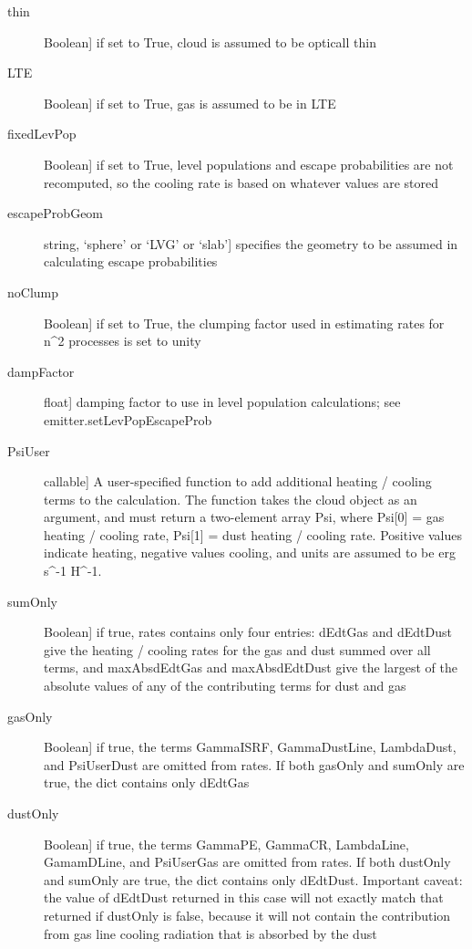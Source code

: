 \documentclass[letterpaper,10pt,english]{sphinxmanual}
\begin{document}
\begin{fulllineitems}
\begin{fulllineitems}
\begin{description}
\begin{description}
\item[{thin}] \leavevmode{[}Boolean{]}
if set to True, cloud is assumed to be opticall thin

\item[{LTE}] \leavevmode{[}Boolean{]}
if set to True, gas is assumed to be in LTE

\item[{fixedLevPop}] \leavevmode{[}Boolean{]}
if set to True, level populations and escape
probabilities are not recomputed, so the cooling rate is
based on whatever values are stored

\item[{escapeProbGeom}] \leavevmode{[}string, `sphere' or `LVG' or `slab'{]}
specifies the geometry to be assumed in calculating
escape probabilities

\item[{noClump}] \leavevmode{[}Boolean{]}
if set to True, the clumping factor used in estimating
rates for n\textasciicircum{}2 processes is set to unity

\item[{dampFactor}] \leavevmode{[}float{]}
damping factor to use in level population calculations;
see emitter.setLevPopEscapeProb

\item[{PsiUser}] \leavevmode{[}callable{]}
A user-specified function to add additional heating /
cooling terms to the calculation. The function takes the
cloud object as an argument, and must return a two-element
array Psi, where Psi{[}0{]} = gas heating / cooling rate,
Psi{[}1{]} = dust heating / cooling rate. Positive values
indicate heating, negative values cooling, and units are
assumed to be erg s\textasciicircum{}-1 H\textasciicircum{}-1.

\item[{sumOnly}] \leavevmode{[}Boolean{]}
if true, rates contains only four entries: dEdtGas and
dEdtDust give the heating / cooling rates for the
gas and dust summed over all terms, and maxAbsdEdtGas and
maxAbsdEdtDust give the largest of the absolute values of
any of the contributing terms for dust and gas

\item[{gasOnly}] \leavevmode{[}Boolean{]}
if true, the terms GammaISRF, GammaDustLine, LambdaDust,               and PsiUserDust are omitted from rates. If both gasOnly
and sumOnly are true, the dict contains only dEdtGas

\item[{dustOnly}] \leavevmode{[}Boolean{]}
if true, the terms GammaPE, GammaCR, LambdaLine,
GamamDLine, and PsiUserGas are omitted from rates. If both
dustOnly and sumOnly are true, the dict contains only
dEdtDust. Important caveat: the value of dEdtDust returned
in this case will not exactly match that returned if
dustOnly is false, because it will not contain the
contribution from gas line cooling radiation that is
absorbed by the dust


\end{description}
\end{description}
\end{fulllineitems}
\end{fulllineitems}
\end{document}
